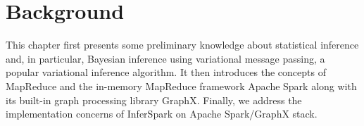 \chapter{Background}
\label{chap:background}
This chapter first presents some preliminary knowledge about statistical
inference and, in particular, Bayesian inference using variational message
passing, a popular variational inference algorithm.  It then introduces the
concepts of MapReduce and the in-memory MapReduce framework Apache Spark along
with its built-in graph processing library GraphX. Finally, we address the
implementation concerns of InferSpark on Apache Spark/GraphX stack.
 




